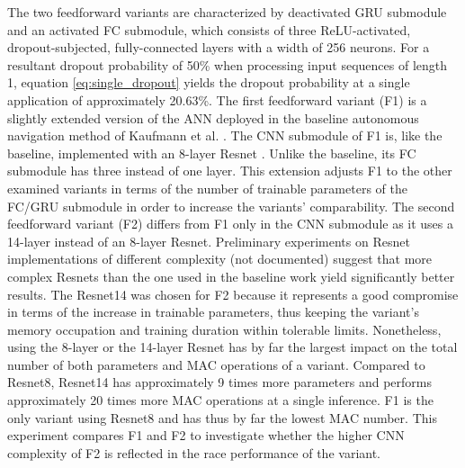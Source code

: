 The two feedforward variants 
are characterized by 
deactivated GRU submodule and an activated FC submodule,
which consists of three
ReLU-activated, dropout-subjected, fully-connected layers
with a width of 256 neurons.
For a resultant dropout probability of 50\%
when processing input sequences of length 1,
equation \ref{eq:single_dropout} yields the dropout probability 
at a single application of approximately 20.63\%.
The first feedforward variant (F1)
is a slightly extended version of the ANN 
deployed in the baseline autonomous navigation method 
of Kaufmann et al. \cite{Kaufmann2018}.
The CNN submodule of F1 is,
like the baseline, 
implemented with an 8-layer Resnet \cite{He2015}.
Unlike the baseline, its FC submodule 
has three instead of one layer.
This extension adjusts F1
to the other examined variants in terms of
the number of trainable parameters of the FC/GRU submodule
in order to increase the variants' comparability.
The second feedforward variant (F2) differs from F1
only in the CNN submodule
as it uses a 14-layer instead of an 8-layer Resnet.
Preliminary experiments on Resnet
implementations of different complexity
(not documented)
suggest that more complex Resnets 
than the one used in the baseline work
yield significantly better results.
The Resnet14 was chosen for F2
because it represents a good compromise
in terms of the increase in trainable parameters,
thus keeping the variant's
memory occupation 
and training duration within tolerable limits.
Nonetheless, using the 8-layer or the 14-layer Resnet
has by far the largest impact on the 
total number of both parameters and MAC operations of a variant.
Compared to Resnet8, 
Resnet14 has approximately 
9 times more parameters and 
performs approximately 20 times more MAC operations
at a single inference.
F1 is the only variant using Resnet8
and has thus by far the lowest MAC number.
This experiment compares F1 and F2 
to investigate whether the higher CNN complexity of F2 
is reflected in the race performance of the variant.


